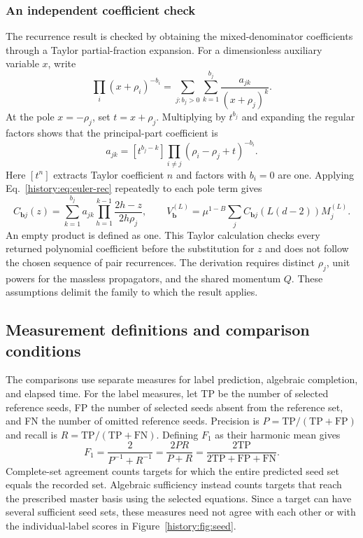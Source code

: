 \subsubsection{An independent coefficient check}
The recurrence result is checked by obtaining the mixed-denominator coefficients through a Taylor partial-fraction expansion. For a dimensionless auxiliary variable $x$, write
\begin{equation}
 \prod_i(x+\rho_i)^{-b_i}
   =\sum_{j:b_j>0}\sum_{k=1}^{b_j}\frac{a_{jk}}{(x+\rho_j)^k}.
\end{equation}
At the pole $x=-\rho_j$, set $t=x+\rho_j$. Multiplying by $t^{b_j}$ and expanding the regular factors shows that the principal-part coefficient is
\begin{equation}
 a_{jk}=[t^{b_j-k}]\prod_{i\ne j}(\rho_i-\rho_j+t)^{-b_i}.
 \label{history:eq:taylor}
\end{equation}
Here $[t^n]$ extracts Taylor coefficient $n$ and factors with $b_i=0$ are one. Applying Eq.~\eqref{history:eq:euler-rec} repeatedly to each pole term gives
\begin{equation}
 C_{\boldsymbol b j}(z)=\sum_{k=1}^{b_j}a_{jk}
       \prod_{h=1}^{k-1}\frac{2h-z}{2h\rho_j},
 \qquad
 V^{(L)}_{\boldsymbol b}
 =\mu^{1-B}\sum_j C_{\boldsymbol b j}(L(d-2))M_j^{(L)}.
 \label{history:eq:checked-vacuum}
\end{equation}
An empty product is defined as one. This Taylor calculation checks every returned polynomial coefficient before the substitution for $z$ and does not follow the chosen sequence of pair recurrences. The derivation requires distinct $\rho_j$, unit powers for the massless propagators, and the shared momentum $Q$. These assumptions delimit the family to which the result applies.

\subsection{Measurement definitions and comparison conditions}
\label{history:app:timing}
The comparisons use separate measures for label prediction, algebraic completion, and elapsed time. For the label measures, let TP be the number of selected reference seeds, FP the number of selected seeds absent from the reference set, and FN the number of omitted reference seeds. Precision is $P=\mathrm{TP}/(\mathrm{TP}+\mathrm{FP})$ and recall is $R=\mathrm{TP}/(\mathrm{TP}+\mathrm{FN})$. Defining $F_1$ as their harmonic mean gives
\begin{equation}
 F_1=\frac{2}{P^{-1}+R^{-1}}=\frac{2PR}{P+R}
     =\frac{2\mathrm{TP}}{2\mathrm{TP}+\mathrm{FP}+\mathrm{FN}}.
\end{equation}
Complete-set agreement counts targets for which the entire predicted seed set equals the recorded set. Algebraic sufficiency instead counts targets that reach the prescribed master basis using the selected equations. Since a target can have several sufficient seed sets, these measures need not agree with each other or with the individual-label scores in Figure~\ref{history:fig:seed}.

